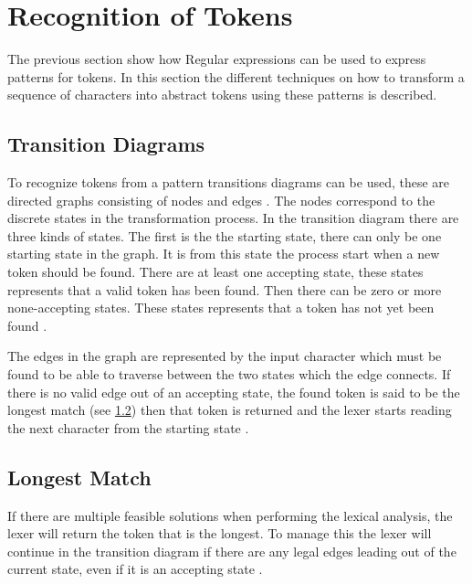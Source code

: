 \newpage
\section{Recognition of Tokens}
The previous section show how Regular expressions can be used
to express patterns for tokens. In this section the different techniques on how
to transform a sequence of characters into abstract tokens using these patterns
is described.

\subsection{Transition Diagrams}
To recognize tokens from a pattern transitions diagrams can be used, these are
directed graphs consisting of nodes and edges \cite{sebesta2012}. The nodes
correspond to the discrete states in the transformation process. In the
transition diagram there are three kinds of states. The first is the the
starting state, there can only be one starting state in the graph. It is from
this state the process start when a new token should be found. There are at
least one accepting state, these states represents that a valid token has been
found. Then there can be zero or more none-accepting states. These states
represents that a token has not yet been found \cite{Aho2006}.

The edges in the graph are represented by the input character which must be
found to be able to traverse between the two states which the edge connects. If
there is no valid edge out of an accepting state, the found token is said to be
the longest match (see \cref{sub:longmatch}) then that token is returned and the
lexer starts reading the next character from the starting state \cite{Aho2006}.

\subsection{Longest Match}\label{sub:longmatch}
If there are multiple feasible solutions when performing the lexical
analysis, the lexer will return the token that is the longest. To manage this
the lexer will continue in the transition diagram if there are any legal edges
leading out of the current state, even if it is an accepting state \cite{Aho2006}.

